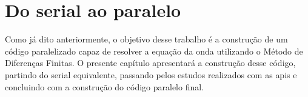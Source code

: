 \chapter{Do serial ao paralelo}

\label{cap:implementation}

Como já dito anteriormente, o objetivo desse trabalho é a construção
de um código paralelizado capaz de resolver a equação da onda utilizando
o Método de Diferenças Finitas. O presente capítulo apresentará a
construção desse código, partindo do serial equivalente, passando pelos
estudos realizados com as \glspl{api} e concluindo com a construção do
código paralelo final.








